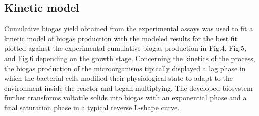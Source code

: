 \subsection{Kinetic model}
Cumulative biogas yield obtained from the experimental assays was used to fit a kinetic model of biogas production with the modeled results for the best fit plotted against the experimental cumulative biogas production in Fig.4, Fig.5, and Fig.6 depending on the growth stage.
Concerning the kinetics of the process, the biogas production of the microorganisms tipically displayed a lag phase in which the bacterial cells modified their physiological state to adapt to the environment inside the reactor and began multiplying. The developed biosystem further transforms voltatile solids into biogas with an exponential phase and a final saturation phase in a typical reverse L-shape curve.